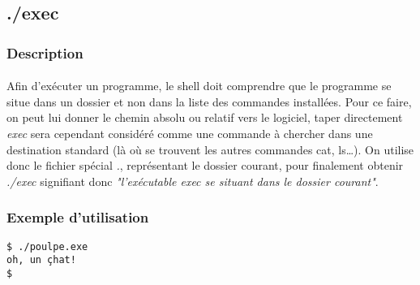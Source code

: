 \subsection{./exec}

\subsubsection*{Description}

\paragraph{} Afin d'exécuter un programme, le shell doit comprendre que le
programme se situe dans un dossier et non dans la liste des commandes
installées.  Pour ce faire, on peut lui donner le chemin absolu ou relatif vers
le logiciel, taper directement \emph{exec} sera cependant considéré comme une
commande à chercher dans une destination standard (là où se trouvent les autres
commandes cat, ls\ldots).  On utilise donc le fichier spécial \emph{.},
représentant le dossier courant, pour finalement obtenir \emph{./exec}
signifiant donc \emph{"l'exécutable exec se situant dans le dossier courant"}.

\subsubsection*{Exemple d'utilisation}
\begin{lstlisting}
$ ./poulpe.exe
oh, un çhat!
$ 
\end{lstlisting}
